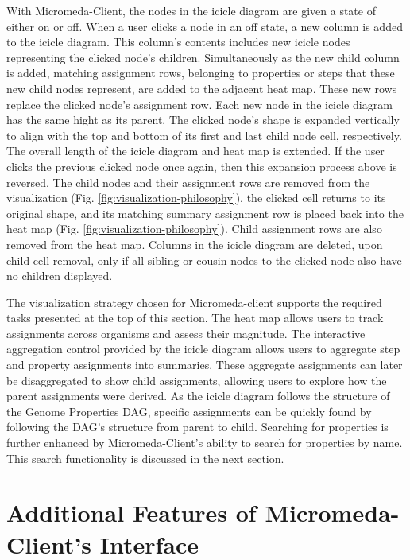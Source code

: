With Micromeda-Client, the nodes in the icicle diagram are given a state of either on or off. When a user clicks a node in an off state, a new column is added to the icicle diagram. This column's contents includes new icicle nodes representing the clicked node's children. Simultaneously as the new child column is added, matching assignment rows, belonging to properties or steps that these new child nodes represent, are added to the adjacent heat map. These new rows replace the clicked node's assignment row. Each new node in the icicle diagram has the same hight as its parent. The clicked node's shape is expanded vertically to align with the top and bottom of its first and last child node cell, respectively. The overall length of the icicle diagram and heat map is extended. If the user clicks the previous clicked node once again, then this expansion process above is reversed. The child nodes and their assignment rows are removed from the visualization (Fig. \ref{fig:visualization-philosophy}), the clicked cell returns to its original shape, and its matching summary assignment row is placed back into the heat map (Fig. \ref{fig:visualization-philosophy}). Child assignment rows are also removed from the heat map. Columns in the icicle diagram are deleted, upon child cell removal, only if all sibling or cousin nodes to the clicked node also have no children displayed.

The visualization strategy chosen for Micromeda-client supports the required tasks presented at the top of this section. The heat map allows users to track assignments across organisms and assess their magnitude. The interactive aggregation control provided by the icicle diagram allows users to aggregate step and property assignments into summaries. These aggregate assignments can later be disaggregated to show child assignments, allowing users to explore how the parent assignments were derived. As the icicle diagram follows the structure of the Genome Properties DAG, specific assignments can be quickly found by following the DAG's structure from parent to child. Searching for properties is further enhanced by Micromeda-Client's ability to search for properties by name. This search functionality is discussed in the next section.

\section{Additional Features of Micromeda-Client's Interface} \label{client-additional-features}

